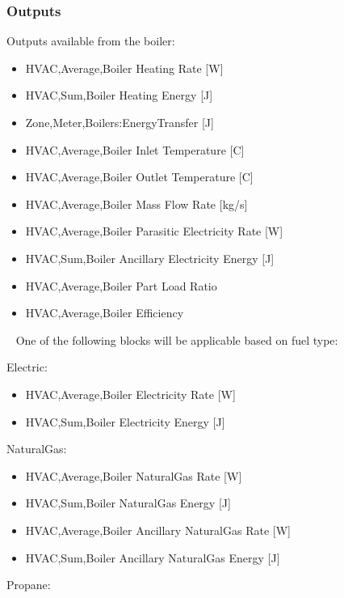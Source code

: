 \subsubsection{Outputs}\label{outputs-10-005}

Outputs available from the boiler:

\begin{itemize}
    \item
    HVAC,Average,Boiler Heating Rate {[}W{]}
    \item
    HVAC,Sum,Boiler Heating Energy {[}J{]}
    \item
    Zone,Meter,Boilers:EnergyTransfer {[}J{]}
    \item
    HVAC,Average,Boiler Inlet Temperature {[}C{]}
    \item
    HVAC,Average,Boiler Outlet Temperature {[}C{]}
    \item
    HVAC,Average,Boiler Mass Flow Rate {[}kg/s{]}
    \item
    HVAC,Average,Boiler Parasitic Electricity Rate {[}W{]}
    \item
    HVAC,Sum,Boiler Ancillary Electricity Energy {[}J{]}
    \item
    HVAC,Average,Boiler Part Load Ratio
    \item
    HVAC,Average,Boiler Efficiency
\end{itemize}

~ One of the following blocks will be applicable based on fuel type:

Electric:

\begin{itemize}
    \item
    HVAC,Average,Boiler Electricity Rate {[}W{]}
    \item
    HVAC,Sum,Boiler Electricity Energy {[}J{]}
\end{itemize}

NaturalGas:

\begin{itemize}
    \item
    HVAC,Average,Boiler NaturalGas Rate {[}W{]}
    \item
    HVAC,Sum,Boiler NaturalGas Energy {[}J{]}
    \item
    HVAC,Average,Boiler Ancillary NaturalGas Rate {[}W{]}
    \item
    HVAC,Sum,Boiler Ancillary NaturalGas Energy {[}J{]}
\end{itemize}

Propane:

